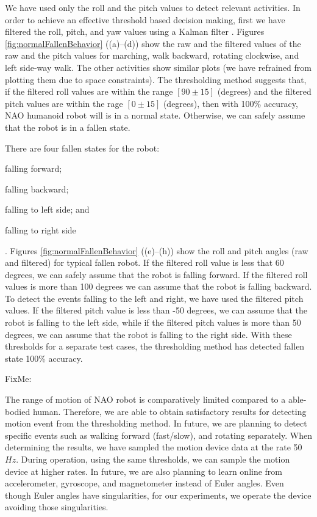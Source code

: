 \documentclass[letterpaper]{article}
\begin{document}
We have used only the roll and the pitch values  to detect relevant activities. In order to achieve 
an effective threshold based decision making, first we have filtered the roll, pitch, and
yaw values using a Kalman filter \cite{Welch:1995:IKF:897831}. Figures 
\ref{fig:normalFallenBehavior} ((a)--(d)) show
the raw and the filtered values of the raw and the pitch values for marching, walk backward,
rotating clockwise, and left side-way walk. The other activities show similar plots (we have 
refrained from plotting them due to space constraints). The thresholding method
suggests that, if the filtered roll values are within the range $[90\pm15]$ (degrees) and the
filtered pitch values are within the rage $[0\pm15]$ (degrees), then with 100\% accuracy, NAO 
humanoid robot will is in a normal state. Otherwise, we can safely assume that the robot is in 
a fallen state.   

There are four fallen states for the robot: \begin{inparaenum}[(1)] \item falling
forward; \item falling backward; \item falling to left side; and \item falling to right
side\end{inparaenum}. Figures \ref{fig:normalFallenBehavior} ((e)--(h)) show the roll and pitch 
angles (raw and filtered) for typical fallen robot. If the filtered roll value is less that 60 
degrees, we can safely assume that the robot is falling forward. If the filtered roll values is 
more than 100 degrees we can assume that the robot is falling backward. To detect the events 
falling to the left and right, we have used the filtered pitch values. If the filtered pitch value 
is less than -50 degrees, we can assume that the robot is falling to the left side, while if the 
filtered pitch values is more than 50 degrees, we can assume that the robot is falling to the right 
side. With these thresholds for a separate test cases, the thresholding method has detected fallen 
state 100\% accuracy. 

FixMe:

The range of motion of NAO robot is comparatively limited compared to a able-bodied human.
Therefore, we are able to obtain satisfactory results for detecting motion event from the
thresholding method. In future, we are planning to detect specific events such as walking forward
(fast/slow), and rotating separately. When determining the results, we have sampled the motion
device data at the rate 50$Hz$. During operation, using the same thresholds, we can sample the
motion device at higher rates. In future, we are also planning to learn online from accelerometer,
gyroscope, and magnetometer instead of Euler angles. Even though Euler angles have singularities,
for our experiments, we operate the device avoiding those singularities.  
\end{document}
